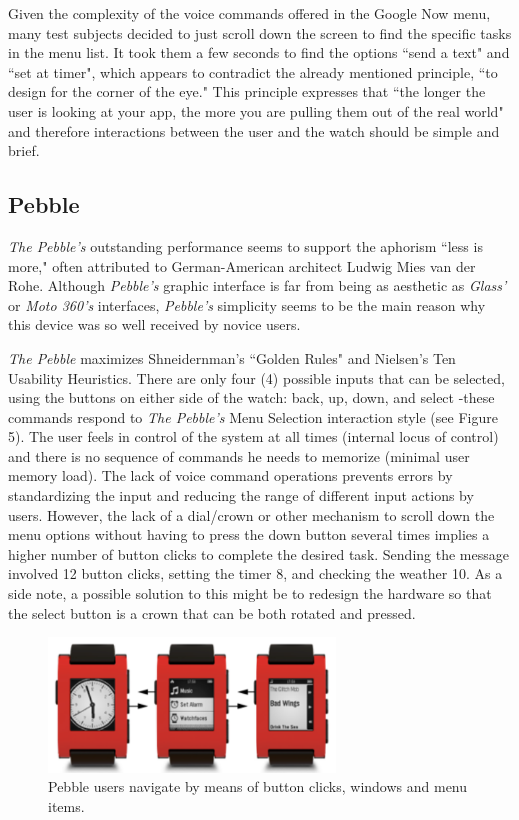 \documentclass[11pt,a4paper]{scrartcl}
\begin{document}
Given the complexity of the voice commands offered in the Google Now menu, many test subjects decided to just scroll down the screen to find the specific tasks in the menu list. It took them a few seconds to find the options ``send a text" and  ``set at timer", which appears to contradict the already mentioned principle, ``to design for the corner of the eye." This principle expresses that ``the longer the user is looking at your app, the more you are pulling them out of the real world"\cite{moto360} and therefore interactions between the user and the watch should be simple and brief.
 
\subsection{Pebble}
\textit{The Pebble's} outstanding performance seems to support the aphorism ``less is more," often attributed to German-American architect Ludwig Mies van der Rohe. Although \textit{Pebble's} graphic interface is far from being as aesthetic as \textit{Glass'} or \textit{Moto 360's} interfaces, \textit{Pebble's} simplicity seems to be the main reason why this device was so well received by novice users.

\textit{The Pebble} maximizes Shneidernman's ``Golden Rules" and Nielsen's Ten Usability Heuristics. \cite{plaisant09} There are only four (4) possible inputs that can be selected, using the buttons on either side of the watch: back, up, down, and select -these commands respond to \textit{The Pebble's} Menu Selection interaction style (see Figure 5). The user feels in control of the system at all times (internal locus of control) and there is no sequence of commands he needs to memorize (minimal user memory load). The lack of voice command operations prevents errors by standardizing the input and reducing the range of different input actions by users. However, the lack of a dial/crown or other mechanism to scroll down the menu options without having to press the down button several times implies a higher number of button clicks to complete the desired task. Sending the message involved 12 button clicks, setting the timer 8, and checking the weather 10. As a side note, a possible solution to this might be to redesign the hardware so that the select button is a crown that can be both rotated and pressed. %

\begin{figure}[h]
\centering
\includegraphics[width=3in]{pebble_buttons.png}
\caption{Pebble users navigate by means of button clicks, windows and menu items.}
\end{figure}
\end{document}
